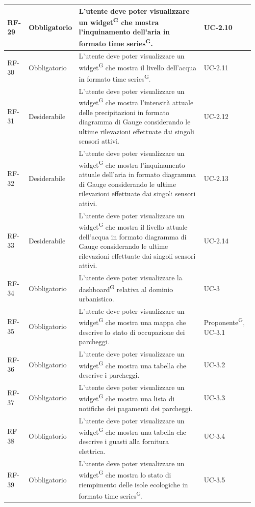 \documentclass[8pt]{article}
\newcommand{\glossterm}[1]{#1\textsuperscript{G}} %
\begin{document}
\begin{longtable}{|>{\centering\arraybackslash}p{1.2cm}|>{\centering\arraybackslash}p{2cm}|>{\centering\arraybackslash}p{8.5cm}|>{\centering\arraybackslash}p{3cm}|}
            RF-29 & Obbligatorio & L'utente deve poter visualizzare un \glossterm{widget} che mostra l'inquinamento dell'aria in formato \glossterm{time series}. & UC-2.10 \\ \hline
            RF-30 & Obbligatorio & L'utente deve poter visualizzare un \glossterm{widget} che mostra il livello dell'acqua in formato \glossterm{time series}. & UC-2.11 \\ \hline
            RF-31 & Desiderabile & L'utente deve poter visualizzare un \glossterm{widget} che mostra l'intensità attuale delle precipitazioni in formato diagramma di Gauge considerando le ultime rilevazioni effettuate dai singoli sensori attivi. & UC-2.12 \\ \hline
            RF-32 & Desiderabile & L'utente deve poter visualizzare un \glossterm{widget} che mostra l'inquinamento attuale dell'aria in formato diagramma di Gauge considerando le ultime rilevazioni effettuate dai singoli sensori attivi. & UC-2.13 \\ \hline
            RF-33 & Desiderabile & L'utente deve poter visualizzare un \glossterm{widget} che mostra il livello attuale dell'acqua in formato diagramma di Gauge considerando le ultime rilevazioni effettuate dai singoli sensori attivi. & UC-2.14 \\ \hline
            RF-34 & Obbligatorio & L'utente deve poter visualizzare la \glossterm{dashboard} relativa al dominio urbanistico. & UC-3 \\ \hline
            RF-35 & Obbligatorio & L'utente deve poter visualizzare un \glossterm{widget} che mostra una mappa che descrive lo stato di occupazione dei parcheggi. & \glossterm{Proponente}, UC-3.1 \\ \hline
            RF-36 & Obbligatorio & L'utente deve poter visualizzare un \glossterm{widget} che mostra una tabella che descrive i parcheggi. & UC-3.2 \\ \hline
            RF-37 & Obbligatorio & L'utente deve poter visualizzare un \glossterm{widget} che mostra una lista di notifiche dei pagamenti dei parcheggi. & UC-3.3 \\ \hline
            RF-38 & Obbligatorio & L'utente deve poter visualizzare un \glossterm{widget} che mostra una tabella che descrive i guasti alla fornitura elettrica. & UC-3.4 \\ \hline
            RF-39 & Obbligatorio & L'utente deve poter visualizzare un \glossterm{widget} che mostra lo stato di riempimento delle isole ecologiche in formato \glossterm{time series}. & UC-3.5 \\ \hline

\end{longtable}
\end{document}
